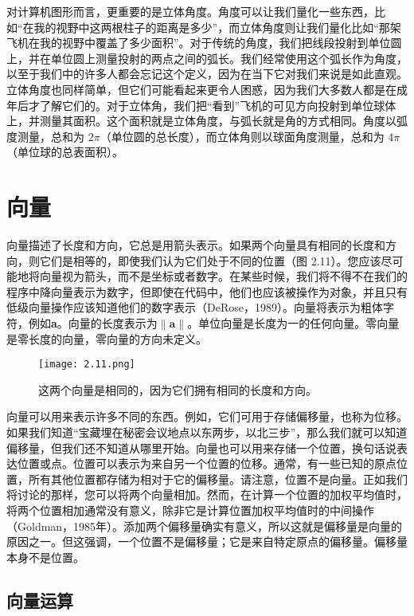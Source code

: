 \documentclass[lang=cn,12pt]{elegantbook}
\begin{document}
对计算机图形而言，更重要的是立体角度。角度可以让我们量化一些东西，比如“在我的视野中这两根柱子的距离是多少”，而立体角度则让我们量化比如“那架飞机在我的视野中覆盖了多少面积”。对于传统的角度，我们把线段投射到单位圆上，并在单位圆上测量投射的两点之间的弧长。我们经常使用这个弧长作为角度，以至于我们中的许多人都会忘记这个定义，因为在当下它对我们来说是如此直观。立体角度也同样简单，但它们可能看起来更令人困惑，因为我们大多数人都是在成年后才了解它们的。对于立体角，我们把“看到”飞机的可见方向投射到单位球体上，并测量其面积。这个面积就是立体角度，与弧长就是角的方式相同。角度以弧度测量，总和为 $2\pi$（单位圆的总长度），而立体角则以球面角度测量，总和为 $4\pi$（单位球的总表面积）。

\section{向量}
向量描述了长度和方向，它总是用箭头表示。如果两个向量具有相同的长度和方向，则它们是相等的，即使我们认为它们处于不同的位置（图 2.11）。您应该尽可能地将向量视为箭头，而不是坐标或者数字。在某些时候，我们将不得不在我们的程序中降向量表示为数字，但即使在代码中，他们也应该被操作为对象，并且只有低级向量操作应该知道他们的数字表示（DeRose，1989）。向量将表示为粗体字符，例如\textbf{a}。向量的长度表示为$\|\mathbf{a}\|$。单位向量是长度为一的任何向量。零向量是零长度的向量，零向量的方向未定义。

\begin{figure}[htbp]
\centering
\texttt{[image: 2.11.png]}
\caption{这两个向量是相同的，因为它们拥有相同的长度和方向。}
\end{figure}

向量可以用来表示许多不同的东西。例如，它们可用于存储偏移量，也称为位移。如果我们知道“宝藏埋在秘密会议地点以东两步，以北三步”，那么我们就可以知道偏移量，但我们还不知道从哪里开始。向量也可以用来存储一个位置，换句话说表达位置或点。位置可以表示为来自另一个位置的位移。通常，有一些已知的原点位置，所有其他位置都存储为相对于它的偏移量。请注意，位置不是向量。正如我们将讨论的那样，您可以将两个向量相加。然而，在计算一个位置的加权平均值时，将两个位置相加通常没有意义，除非它是计算位置加权平均值时的中间操作（Goldman，1985年）。添加两个偏移量确实有意义，所以这就是偏移量是向量的原因之一。但这强调，一个位置不是偏移量；它是来自特定原点的偏移量。偏移量本身不是位置。

\subsection{向量运算}
\end{document}
